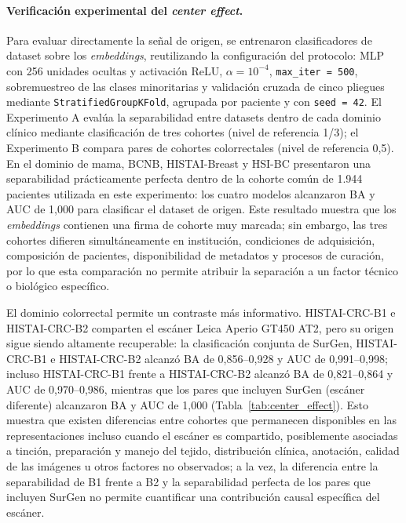 \paragraph{Verificación experimental del \textit{center effect}.} Para evaluar directamente la señal de origen, se entrenaron clasificadores de dataset sobre los \textit{embeddings}, reutilizando la configuración del protocolo: MLP con 256 unidades ocultas y activación ReLU, $\alpha = 10^{-4}$, \texttt{max\_iter = 500}, sobremuestreo de las clases minoritarias y validación cruzada de cinco pliegues mediante \texttt{StratifiedGroupKFold}, agrupada por paciente y con \texttt{seed = 42}. El Experimento A evalúa la separabilidad entre datasets dentro de cada dominio clínico mediante clasificación de tres cohortes (nivel de referencia 1/3); el Experimento B compara pares de cohortes colorrectales (nivel de referencia 0,5). En el dominio de mama, BCNB, HISTAI-Breast y HSI-BC presentaron una separabilidad prácticamente perfecta dentro de la cohorte común de 1.944 pacientes utilizada en este experimento: los cuatro modelos alcanzaron BA y AUC de 1,000 para clasificar el dataset de origen. Este resultado muestra que los \textit{embeddings} contienen una firma de cohorte muy marcada; sin embargo, las tres cohortes difieren simultáneamente en institución, condiciones de adquisición, composición de pacientes, disponibilidad de metadatos y procesos de curación, por lo que esta comparación no permite atribuir la separación a un factor técnico o biológico específico.

El dominio colorrectal permite un contraste más informativo. HISTAI-CRC-B1 e HISTAI-CRC-B2 comparten el escáner Leica Aperio GT450 AT2, pero su origen sigue siendo altamente recuperable: la clasificación conjunta de SurGen, HISTAI-CRC-B1 e HISTAI-CRC-B2 alcanzó BA de 0,856--0,928 y AUC de 0,991--0,998; incluso HISTAI-CRC-B1 frente a HISTAI-CRC-B2 alcanzó BA de 0,821--0,864 y AUC de 0,970--0,986, mientras que los pares que incluyen SurGen (escáner diferente) alcanzaron BA y AUC de 1,000 (Tabla~\ref{tab:center_effect}). Esto muestra que existen diferencias entre cohortes que permanecen disponibles en las representaciones incluso cuando el escáner es compartido, posiblemente asociadas a tinción, preparación y manejo del tejido, distribución clínica, anotación, calidad de las imágenes u otros factores no observados; a la vez, la diferencia entre la separabilidad de B1 frente a B2 y la separabilidad perfecta de los pares que incluyen SurGen no permite cuantificar una contribución causal específica del escáner.

